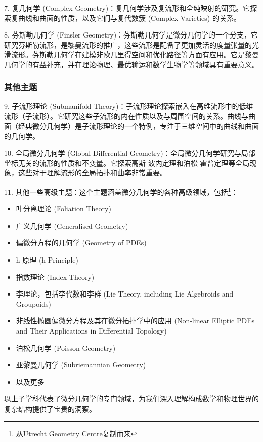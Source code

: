7. 复几何学 (Complex Geometry)：复几何学涉及复流形和全纯映射的研究。它探索复曲线和曲面的性质，以及它们与复代数簇 (Complex Varieties) 的关系。

8. 芬斯勒几何学 (Finsler Geometry)：芬斯勒几何学是微分几何学的一个分支，它研究芬斯勒流形，是黎曼流形的推广，这些流形是配备了更加灵活的度量张量的光滑流形。芬斯勒几何学在建模非欧几里得空间和优化路径等方面有应用。它是黎曼几何学的有益补充，并在理论物理、最优输运和数学生物学等领域具有重要意义。

\subsubsection{其他主题}

9. 子流形理论 (Submanifold Theory)：子流形理论探索嵌入在高维流形中的低维流形（子流形）。它研究这些子流形的内在性质以及与周围空间的关系。曲线与曲面（经典微分几何学）是子流形理论的一个特例，专注于三维空间中的曲线和曲面的几何学。

10. 全局微分几何学 (Global Differential Geometry)：全局微分几何学研究与局部坐标无关的流形的性质和不变量。它探索高斯-波内定理和泊松-霍普定理等全局现象，这些对于理解流形的全局拓扑和曲率非常重要。

11. 其他一些高级主题：这个主题涵盖微分几何学的各种高级领域，包括\footnote{从Utrecht Geometry Centre复制而来}：

\begin{itemize}
\item 叶分离理论 (Foliation Theory)
\item 广义几何学 (Generalised Geometry)
\item 偏微分方程的几何学 (Geometry of PDEs)
\item h-原理 (h-Principle)
\item 指数理论 (Index Theory)
\item 李理论，包括李代数和李群 (Lie Theory, including Lie Algebroids and Groupoids)
\item 非线性椭圆偏微分方程及其在微分拓扑学中的应用 (Non-linear Elliptic PDEs and Their Applications in Differential Topology)
\item 泊松几何学 (Poisson Geometry)
\item 亚黎曼几何学 (Subriemannian Geometry)
\item 以及更多
\end{itemize}

以上子学科代表了微分几何学的专门领域，为我们深入理解构成数学和物理世界的复杂结构提供了宝贵的洞察。
